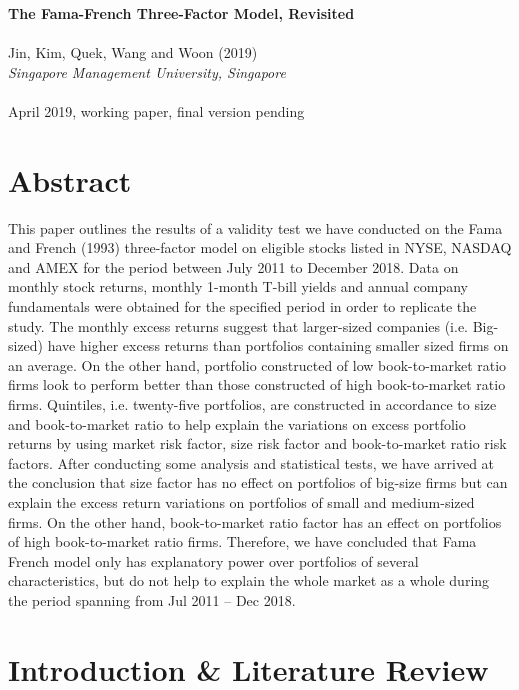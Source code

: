 \documentclass[12pt]{article}
\begin{document}
	\thispagestyle{plain}
	\noindent \Large \textbf{The Fama-French Three-Factor Model, Revisited}\\ \\
	\noindent Jin, Kim, Quek, Wang and Woon (2019)\\
	\noindent \normalsize \textit{Singapore Management University, Singapore}\\ \\
	\noindent April 2019, working paper, final version pending
	
		\section{Abstract} %
	
	This paper outlines the results of a validity test we have conducted on the Fama and French (1993) three-factor model on eligible stocks listed in NYSE, NASDAQ and AMEX for the period between July 2011 to December 2018. Data on monthly stock returns, monthly 1-month T-bill yields and annual company fundamentals were obtained for the specified period in order to replicate the study. The monthly excess returns suggest that larger-sized companies (i.e. Big-sized) have higher excess returns than portfolios containing smaller sized firms on an average. On the other hand, portfolio constructed of low book-to-market ratio firms look to perform better than those constructed of high book-to-market ratio firms. Quintiles, i.e. twenty-five portfolios, are constructed in accordance to size and book-to-market ratio to help explain the variations on excess portfolio returns by using market risk factor, size risk factor and book-to-market ratio risk factors. After conducting some analysis and statistical tests, we have arrived at the conclusion that size factor has no effect on portfolios of big-size firms but can explain the excess return variations on portfolios of small and medium-sized firms. On the other hand, book-to-market ratio factor has an effect on portfolios of high book-to-market ratio firms. Therefore, we have concluded that Fama French model only has explanatory power over portfolios of several characteristics, but do not help to explain the whole market as a whole during the period spanning from Jul 2011 – Dec 2018.
	
	
	\section{Introduction \& Literature Review} %
	
\end{document}
